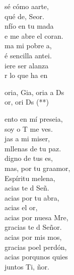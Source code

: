 \begin{cancion}%
	 sé cómo aarte, \\
	 qué de, Seor.\\
	nfío en tu mada \\
	e me abre el coran.\\
	ma mi pobre a, \\
	é sencilla antei.\\
	iere ser alanza\\
	r lo que ha en  \\
	\begin{chorus}%
	oria, Gia, oria a Ds\\
	or, ori Ds (**)\\
	\end{chorus}%
	ento en mí preseia,\\
	soy o T me ves.\\
	jas a mi miser, \\
	mllenas de tu paz.\\
	digno de tus es, \\
	mas, por tu graamor,\\
	 Espíritu melena, \\
	acias te d Señ. \\
	acias por tu abra, \\
	acias  el or,\\
	acias por nuesa Mre, \\
	gracias te d Señor.\\
	acias por mis mos, \\
	gracias poel perdón,\\
	acias porqunos quies\\
	juntos Ti, ñor.\\
\end{cancion}%
